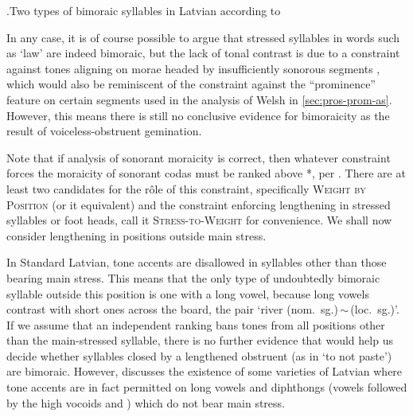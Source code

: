 \ex.\label{ex:latvian-multiple-morae}Two types of bimoraic syllables in Latvian according to \citet{karins96:_latvian}\\


In any case, it is of course possible to argue that stressed syllables in words such as \ipa{[ˈlikːums]} `law' are indeed bimoraic, but the lack of tonal contrast is due to a constraint against tones aligning on morae headed by insufficiently sonorous segments \citep[\egm][]{delacy2002,moren06:_thai}, which would also be reminiscent of the constraint against the \enquote{prominence} feature on certain segments used in the analysis of Welsh in \cref{sec:pros-prom-as}. However, this means there is still no conclusive evidence for bimoraicity as the result of voiceless\hyp obstruent gemination.

Note that if  analysis of sonorant moraicity is correct, then whatever constraint forces the moraicity of sonorant codas must be ranked above *\mo[son], per \citet{moren01:_distin}. There are at least two candidates for the rôle of this constraint, specifically \textsc{Weight by Position} (or it equivalent) and the constraint enforcing lengthening in stressed syllables or foot heads, call it \textsc{Stress-to-Weight} \citep{prince92:_quant} for convenience. We shall now consider lengthening in positions outside main stress.

In Standard Latvian, tone accents are disallowed in syllables other than those bearing main stress. This means that the only type of undoubtedly bimoraic syllable outside this position is one with a long vowel, because long vowels contrast with short ones across the board, \cf the pair \alternation{[ˈupe]}{[ˈupeː]} `river (nom.~sg.)\,$\sim$\,(loc.~sg.)'. If we assume that an independent ranking bans tones from all positions other than the main\hyp stressed syllable, there is no further evidence that would help us decide whether syllables closed by a lengthened obstruent (as in \ipa{[ˈnesːalipːinɑːt]} `to not paste') are bimoraic. However, \citet{serzants03:_inton_endsil_lettis} discusses the existence of some varieties of Latvian where tone accents are in fact permitted on long vowels and diphthongs (\ie vowels followed by the high vocoids \ipa{[i]} and \ipa{[u]}) which do not bear main stress.

